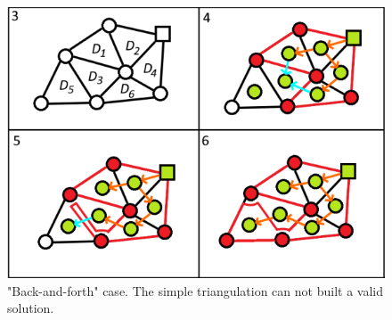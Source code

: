 \begin{figure}[h]
	\begin{centering}
		\centerline
		{\includegraphics[scale = 0.8]{figures/related_work/back_and_forth.png}}
		\caption{"Back-and-forth" case. The simple triangulation can not built a valid solution.}
		\label{fig:back_and_forth}
	\end{centering}
\end{figure}
\FloatBarrier